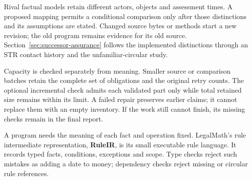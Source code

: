 \begin{MapDiagram}
\end{MapDiagram}

Rival factual models retain different actors, objects and assessment times.
A proposed mapping permits a conditional comparison only after those
distinctions and its assumptions are stated. Changed source bytes or methods
start a new revision; the old program remains evidence for its old source.
Section~\ref{sec:successor-assurance} follows the implemented distinctions
through an STR contact history and the unfamiliar-circular study.

Capacity is checked separately from meaning. Smaller source or comparison
batches retain the complete set of obligations and the original retry counts.
The optional incremental check admits each validated part only while total
retained size remains within its limit. A failed repair preserves earlier
claims; it cannot replace them with an empty inventory. If the work still
cannot finish, its missing checks remain in the final report.

\clearpage
{}
A program needs the meaning of each fact and operation fixed. LegalMath's rule
intermediate representation, \textbf{RuleIR}, is its small executable rule
language. It records typed facts, conditions, exceptions and scope. Type checks
reject such mistakes as adding a date to money; dependency checks reject
missing or circular rule references.

